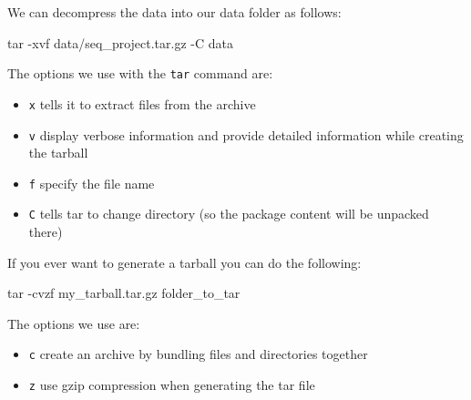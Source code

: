 \documentclass[
  letterpaper,
  DIV=11,
  numbers=noendperiod]{scrreprt}
\newenvironment{Shaded}{}{}
\newcommand{\AttributeTok}[1]{\textcolor[rgb]{0.84,0.23,0.29}{#1}}
\newcommand{\FunctionTok}[1]{\textcolor[rgb]{0.44,0.26,0.76}{#1}}
\newcommand{\NormalTok}[1]{\textcolor[rgb]{0.14,0.16,0.18}{#1}}
\providecommand{\tightlist}{%
  \setlength{\itemsep}{0pt}\setlength{\parskip}{0pt}}\usepackage{longtable,booktabs,array}
\begin{document}
We can decompress the data into our data folder as follows:

\begin{Shaded}
\begin{Highlighting}[]
\FunctionTok{tar} \AttributeTok{{-}xvf}\NormalTok{ data/seq\_project.tar.gz }\AttributeTok{{-}C}\NormalTok{ data}
\end{Highlighting}
\end{Shaded}

The options we use with the \texttt{tar} command are:

\begin{itemize}
\tightlist
\item
  \texttt{x} tells it to extract files from the archive
\item
  \texttt{v} display verbose information and provide detailed
  information while creating the tarball
\item
  \texttt{f} specify the file name
\item
  \texttt{C} tells tar to change directory (so the package content will
  be unpacked there)
\end{itemize}

\begin{tcolorbox}[enhanced jigsaw, bottomtitle=1mm, colframe=quarto-callout-tip-color-frame, left=2mm, leftrule=.75mm, coltitle=black, colbacktitle=quarto-callout-tip-color!10!white, toprule=.15mm, rightrule=.15mm, opacityback=0, titlerule=0mm, colback=white, breakable, bottomrule=.15mm, title=\textcolor{quarto-callout-tip-color}{\faLightbulb}\hspace{0.5em}{Tip: how to generate a tarball}, arc=.35mm, toptitle=1mm, opacitybacktitle=0.6]

If you ever want to generate a tarball you can do the following:

\begin{Shaded}
\begin{Highlighting}[]
\FunctionTok{tar} \AttributeTok{{-}cvzf}\NormalTok{ my\_tarball.tar.gz folder\_to\_tar}
\end{Highlighting}
\end{Shaded}

The options we use are:

\begin{itemize}
\tightlist
\item
  \texttt{c} create an archive by bundling files and directories
  together
\item
  \texttt{z} use gzip compression when generating the tar file
\end{itemize}

\end{tcolorbox}
\end{document}
